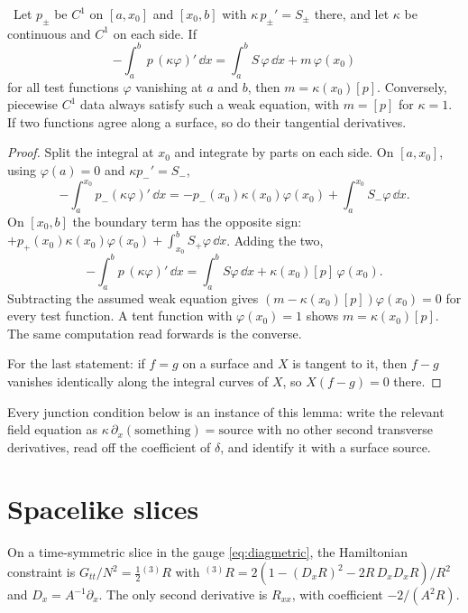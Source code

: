 \begin{lemma}\label{lem:deltacoeff}\ver\
Let $p_\pm$ be $C^1$ on $[a,x_0]$ and $[x_0,b]$ with $\kappa\,p_\pm'=S_\pm$ there, and let $\kappa$ be continuous and $C^1$ on each side. If
\[
-\int_a^b\,p\,(\kappa\varphi)'\,\dd x=\int_a^bS\,\varphi\,\dd x+m\,\varphi(x_0)
\]
for all test functions $\varphi$ vanishing at $a$ and $b$, then $m=\kappa(x_0)[p]$. Conversely, piecewise $C^1$ data always satisfy such a weak equation, with $m=[p]$ for $\kappa=1$. If two functions agree along a surface, so do their tangential derivatives.
\end{lemma}
\begin{proof}
Split the integral at $x_0$ and integrate by parts on each side. On $[a,x_0]$, using $\varphi(a)=0$ and $\kappa p_-'=S_-$,
\[
-\int_a^{x_0}p_-(\kappa\varphi)'\,\dd x=-p_-(x_0)\kappa(x_0)\varphi(x_0)+\int_a^{x_0}S_-\varphi\,\dd x .
\]
On $[x_0,b]$ the boundary term has the opposite sign: $+p_+(x_0)\kappa(x_0)\varphi(x_0)+\int_{x_0}^bS_+\varphi\,\dd x$. Adding the two,
\[
-\int_a^bp\,(\kappa\varphi)'\,\dd x=\int_a^bS\varphi\,\dd x+\kappa(x_0)[p]\,\varphi(x_0).
\]
Subtracting the assumed weak equation gives $(m-\kappa(x_0)[p])\varphi(x_0)=0$ for every test function. A tent function with $\varphi(x_0)=1$ shows $m=\kappa(x_0)[p]$. The same computation read forwards is the converse.

For the last statement: if $f=g$ on a surface and $X$ is tangent to it, then $f-g$ vanishes identically along the integral curves of $X$, so $X(f-g)=0$ there.
\end{proof}


Every junction condition below is an instance of this lemma: write the relevant field equation as $\kappa\,\partial_x(\text{something})=\text{source}$ with no other second transverse derivatives, read off the coefficient of $\delta$, and identify it with a surface source.

\section{Spacelike slices}

On a time-symmetric slice in the gauge \eqref{eq:diagmetric}, the Hamiltonian constraint is $G_{tt}/N^2=\frac12{}^{(3)}R$ with ${}^{(3)}R=2(1-(D_xR)^2-2R\,D_xD_xR)/R^2$ and $D_x=A^{-1}\partial_x$. The only second derivative is $R_{xx}$, with coefficient $-2/(A^2R)$.

